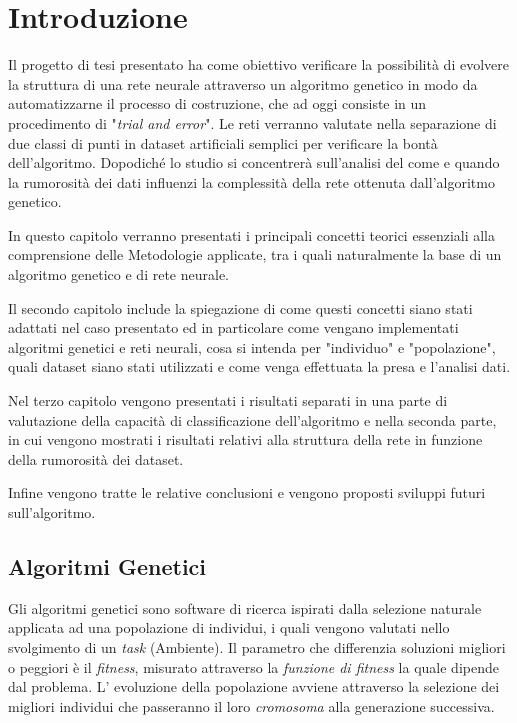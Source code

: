 \documentclass[12pt,a4paper]{report}
\begin{document}
\tableofcontents

\chapter{Introduzione}

Il progetto di tesi presentato ha come obiettivo verificare la possibilità di evolvere la struttura di una rete neurale attraverso un algoritmo genetico in modo da automatizzarne il processo di costruzione, che ad oggi consiste in un procedimento di "\textit{trial and error}".
Le reti verranno valutate nella separazione di due classi di punti in dataset artificiali semplici per verificare la bontà dell'algoritmo. 
Dopodiché lo studio si concentrerà sull'analisi del come e quando la rumorosità dei dati influenzi la complessità della rete ottenuta dall'algoritmo genetico.

In questo capitolo verranno presentati i principali concetti teorici essenziali alla comprensione delle Metodologie applicate, tra i quali naturalmente la base di un algoritmo genetico e di rete neurale.

Il secondo capitolo include la spiegazione di come questi concetti siano stati adattati nel caso presentato ed in particolare come vengano implementati algoritmi genetici e reti neurali, cosa si intenda per "individuo" e "popolazione", quali dataset siano stati utilizzati e come venga effettuata la presa e l'analisi dati.

Nel terzo capitolo vengono presentati i risultati separati in una parte di valutazione della capacità di classificazione dell'algoritmo e nella seconda parte, in cui vengono mostrati i risultati relativi alla struttura della rete in funzione della rumorosità dei dataset. 

Infine vengono tratte le relative conclusioni e vengono proposti sviluppi futuri sull'algoritmo.

\section{Algoritmi Genetici}\label{alg-gen} 

Gli algoritmi genetici sono software di ricerca ispirati dalla selezione naturale applicata ad una popolazione di individui, i quali vengono valutati nello svolgimento di un \textit{task} (Ambiente).
Il parametro che differenzia soluzioni migliori o peggiori è il \textit{fitness}, misurato attraverso la \textit{funzione di fitness} la quale dipende dal problema.
L' evoluzione della popolazione avviene attraverso la selezione dei migliori individui che passeranno il loro \textit{cromosoma} alla generazione successiva.
\end{document}
